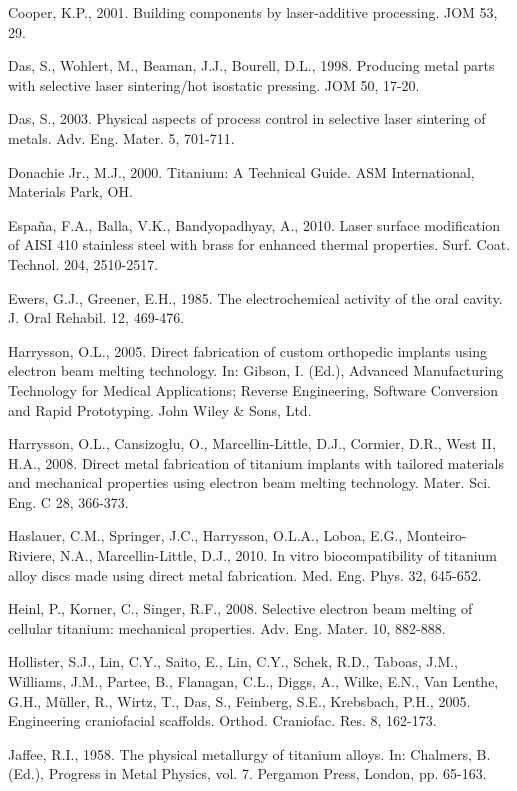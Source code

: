 \documentclass[10pt]{article}
\begin{document}
Cooper, K.P., 2001. Building components by laser-additive processing. JOM 53, 29.

Das, S., Wohlert, M., Beaman, J.J., Bourell, D.L., 1998. Producing metal parts with selective laser sintering/hot isostatic pressing. JOM 50, 17-20.

Das, S., 2003. Physical aspects of process control in selective laser sintering of metals. Adv. Eng. Mater. 5, 701-711.

Donachie Jr., M.J., 2000. Titanium: A Technical Guide. ASM International, Materials Park, OH.

España, F.A., Balla, V.K., Bandyopadhyay, A., 2010. Laser surface modification of AISI 410 stainless steel with brass for enhanced thermal properties. Surf. Coat. Technol. 204, 2510-2517.

Ewers, G.J., Greener, E.H., 1985. The electrochemical activity of the oral cavity. J. Oral Rehabil. 12, 469-476.

Harrysson, O.L., 2005. Direct fabrication of custom orthopedic implants using electron beam melting technology. In: Gibson, I. (Ed.), Advanced Manufacturing Technology for Medical Applications; Reverse Engineering, Software Conversion and Rapid Prototyping. John Wiley \& Sons, Ltd.

Harrysson, O.L., Cansizoglu, O., Marcellin-Little, D.J., Cormier, D.R., West II, H.A., 2008. Direct metal fabrication of titanium implants with tailored materials and mechanical properties using electron beam melting technology. Mater. Sci. Eng. C 28, 366-373.

Haslauer, C.M., Springer, J.C., Harrysson, O.L.A., Loboa, E.G., Monteiro-Riviere, N.A., Marcellin-Little, D.J., 2010. In vitro biocompatibility of titanium alloy discs made using direct metal fabrication. Med. Eng. Phys. 32, 645-652.

Heinl, P., Korner, C., Singer, R.F., 2008. Selective electron beam melting of cellular titanium: mechanical properties. Adv. Eng. Mater. 10, 882-888.

Hollister, S.J., Lin, C.Y., Saito, E., Lin, C.Y., Schek, R.D., Taboas, J.M., Williams, J.M., Partee, B., Flanagan, C.L., Diggs, A., Wilke, E.N., Van Lenthe, G.H., Müller, R., Wirtz, T., Das, S., Feinberg, S.E., Krebsbach, P.H., 2005. Engineering craniofacial scaffolds. Orthod. Craniofac. Res. 8, 162-173.

Jaffee, R.I., 1958. The physical metallurgy of titanium alloys. In: Chalmers, B. (Ed.), Progress in Metal Physics, vol. 7. Pergamon Press, London, pp. 65-163.
\end{document}
